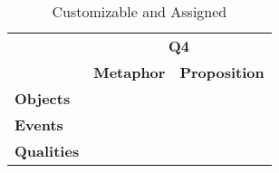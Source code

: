 \begin{table}[!htbp]
\centering
\begin{tabular}{l|l|l|}
\cline{2-3}
                                         & \multicolumn{2}{c|}{\textbf{Q4}}         \\ \cline{2-3} 
                                         & \textbf{Metaphor} & \textbf{Proposition} \\ \hline
\multicolumn{1}{|l|}{\textbf{Objects}}   &                   &                      \\ \hline
\multicolumn{1}{|l|}{\textbf{Events}}    &                   &                      \\ \hline
\multicolumn{1}{|l|}{\textbf{Qualities}} &                   &                      \\ \hline
\end{tabular}
\caption{Customizable and Assigned}
\end{table}
\FloatBarrier